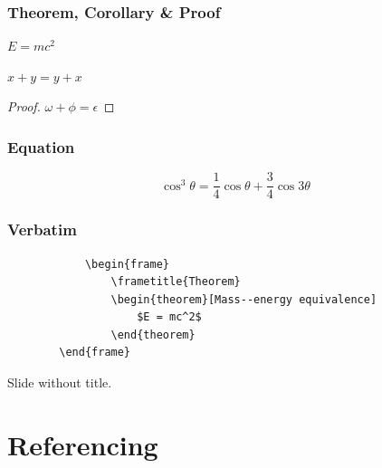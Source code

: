 \documentclass[
	11pt, %
]{beamer}
\begin{document}
\begin{frame}
	\frametitle{Theorem, Corollary \& Proof}
	
	\begin{theorem}
		$E = mc^2$
	\end{theorem}
	
	\begin{corollary}
		$x + y = y + x$
	\end{corollary}
	
	\begin{proof}
		$\omega + \phi = \epsilon$
	\end{proof}
\end{frame}


\begin{frame}
	\frametitle{Equation}

	\begin{equation}
		\cos^3 \theta =\frac{1}{4}\cos\theta+\frac{3}{4}\cos 3\theta
	\end{equation}
\end{frame}


\begin{frame}[fragile] %
	\frametitle{Verbatim}
	
	\begin{example}
		\begin{verbatim}
			\begin{frame}
				\frametitle{Theorem}
				\begin{theorem}[Mass--energy equivalence]
					$E = mc^2$
				\end{theorem}
		\end{frame}\end{verbatim} %
	\end{example}
\end{frame}


\begin{frame}
	Slide without title.
\end{frame}


\section{Referencing}
\end{document}
